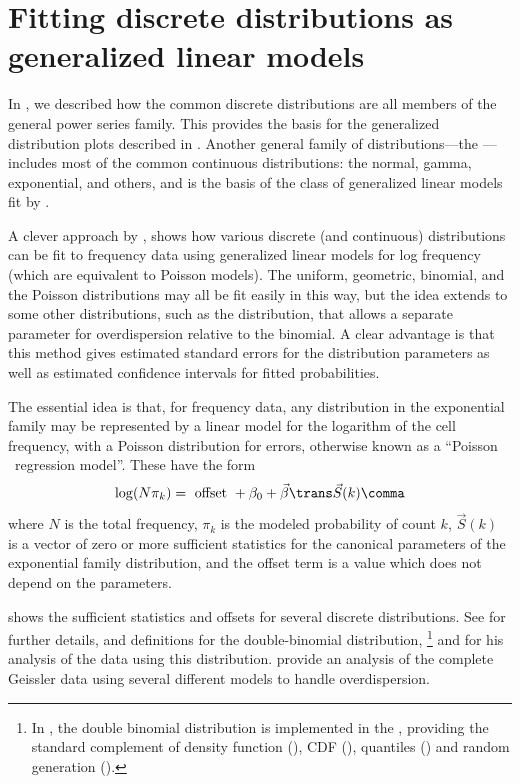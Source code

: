 \documentclass[11pt]{book}
\begin{document}
\section{Fitting discrete distributions as generalized linear models}\label{sec:fitglm}

In , we described how the common discrete distributions
are all members of the general power series family.  This provides the
basis for the generalized distribution plots described in .
Another general family of distributions---the ---%
includes most of the common continuous distributions:
the normal, gamma, exponential, and others,
and is the basis of the class of generalized linear models fit
by .

A clever approach by
\citet{LindseyMersch:92}, \citet[\S 6.1]{Lindsey:95} shows how various discrete
(and continuous)
distributions can be fit to frequency data using generalized linear models
for log frequency (which are equivalent to Poisson \loglin models).
The uniform, geometric, binomial, and the
Poisson distributions may all be fit easily in this way, but the idea extends
to some other distributions, such as the  distribution,
that allows a separate parameter for overdispersion relative to the binomial.
A clear advantage is that this method gives estimated standard errors for the
distribution parameters as well as estimated confidence intervals
for fitted probabilities.

The essential idea is that, for frequency data, any distribution in the
exponential family may be represented by a linear model for the logarithm
of the cell frequency, with a Poisson distribution for errors,
otherwise known as a ``Poisson \loglin\ regression model''.
These have the form
\begin{equation*}
\log (N \pi_k) = \textrm{ offset } + \beta_0 + \vec{\beta}\trans \vec{S}(k)
 \comma
\end{equation*}
where $N$ is the total frequency, $\pi_k$ is the modeled probability
of count $k$, 
$\vec{S}(k)$ is a vector of zero or more sufficient statistics for the
canonical parameters of the exponential family distribution,
and the offset term is a value which does not depend on the
parameters.  

 shows the sufficient statistics and
offsets for several discrete distributions.
See \citet{LindseyMersch:92} for further details, and definitions
for the double-binomial distribution,%
\footnote{
In \R, the double binomial distribution is implemented in the 
, providing the standard complement of
density function (), CDF (),
quantiles ()
and random generation ().
}
and \citet[pp. 130--133]{Lindsey:95}
for his analysis of the  data using this distribution.
\citet{LindseyAltham:1998} provide an analysis of the 
complete Geissler data using several different models to
handle overdispersion.

\end{document}
